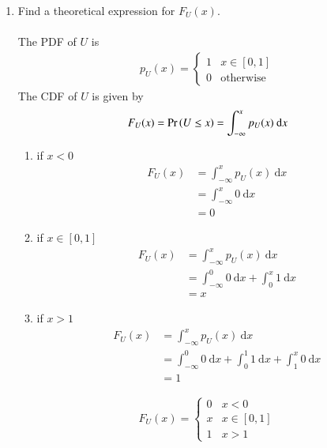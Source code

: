 \documentclass[journal,12pt,twocolumn]{IEEEtran}
\renewcommand\thesection{\arabic{section}}
\begin{document}
\begin{enumerate}[label=\thesection.\arabic*
,ref=\thesection.\theenumi]
\item
Find a  theoretical expression for $F_{U}(x)$.\\
\solution \\
The PDF of $U$ is
	\begin{align}
		p_{U}(x) = 
		\begin{cases}
			1 & x \in [0, 1] \\
			0 & \text{otherwise}
		\end{cases}
	\end{align}
The CDF of $U$ is given by
	\begin{align}
		F_{U}(x) = \Pr\left(U \le x\right) = \int_{-\infty}^x p_{U}(x) ~\mathrm{d}x
	\end{align}
\begin{enumerate}[label=case.\arabic*:]
    \item if $x<0$
    \begin{align}
        F_{U}(x) &= \int_{-\infty}^x p_{U}(x) ~\mathrm{d}x\\
        &= \int_{-\infty}^x 0 ~\mathrm{d}x\\
        &=0
    \end{align}
    \item if $x\in [0, 1]$
    \begin{align}
        F_{U}(x) &= \int_{-\infty}^x p_{U}(x) ~\mathrm{d}x\\
        &= \int_{-\infty}^0 0 ~\mathrm{d}x + \int_{0}^x 1 ~\mathrm{d}x\\
        &=x
    \end{align}
    \item if $x>1$
    \begin{align}
        F_{U}(x) &= \int_{-\infty}^x p_{U}(x) ~\mathrm{d}x\\
        &= \int_{-\infty}^0 0 ~\mathrm{d}x + \int_{0}^1 1 ~\mathrm{d}x+\int_{1}^x 0 ~\mathrm{d}x\\
        &=1
    \end{align}
\end{enumerate}
\begin{align}
		F_{U}(x) = 
		\begin{cases}
		    0 & x<0\\
			x & x \in [0, 1] \\
			1 & x>1
		\end{cases}\label{eq:eq1}
	\end{align}


\end{enumerate}
\end{document}
